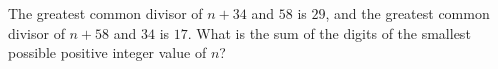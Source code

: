 The greatest common divisor of $n+34$ and $58$ is $29$, and the greatest common divisor of $n+58$ and $34$ is $17$. What is the sum of the digits of the smallest possible positive integer value of $n$?

